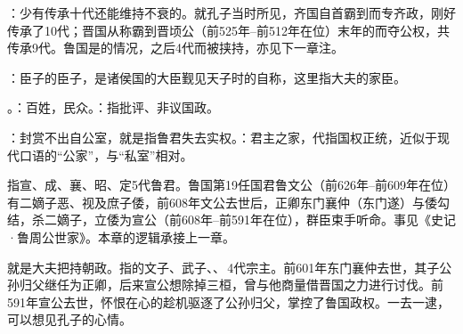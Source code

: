 {\item {}：少有传承十代还能维持不衰的。就孔子当时所见，齐国自首霸到而专齐政，刚好传承了10代；晋国从称霸到晋顷公（前525年--前512年在位）末年的而夺公权，共传承9代。鲁国是的情况，之后4代而被挟持，亦见下一章注。
\item {}：臣子的臣子，是诸侯国的大臣觐见天子时的自称，这里指大夫的家臣。
\item {}。：百姓，民众。：指批评、非议国政。
}
{}


{
\item {}：封赏不出自公室，就是指鲁君失去实权。：君主之家，代指国权正统，近似于现代口语的“公家”，与“私室”相对。

指宣、成、襄、昭、定5代鲁君。鲁国第19任国君鲁文公（前626年--前609年在位）有二嫡子恶、视及庶子倭，前608年文公去世后，正卿东门襄仲（东门遂）与倭勾结，杀二嫡子，立倭为宣公（前608年--前591年在位），群臣束手听命。事见《史记·鲁周公世家》。本章的逻辑承接上一章。

\item {}就是大夫把持朝政。指的文子、武子、、\,4代宗主。前601年东门襄仲去世，其子公孙归父继任为正卿，后来宣公想除掉三桓，曾与他商量借晋国之力进行讨伐。前591年宣公去世，怀恨在心的趁机驱逐了公孙归父，掌控了鲁国政权。一去一逮，可以想见孔子的心情。
}
{}


